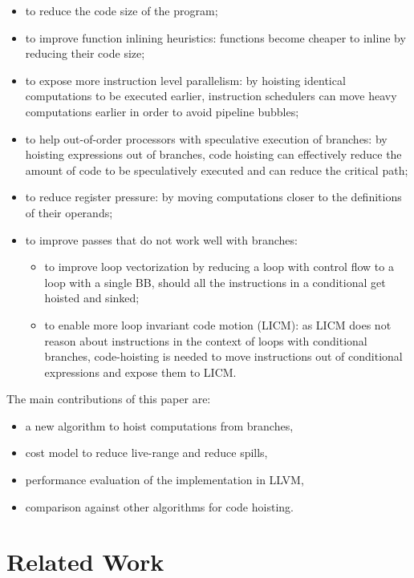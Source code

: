 \documentclass{sig-alternate}
\begin{document}
\begin{itemize}
\item to reduce the code size of the program;
\item to improve function inlining heuristics: functions become cheaper to
  inline by reducing their code size;
\item to expose more instruction level parallelism: by hoisting identical
  computations to be executed earlier, instruction schedulers can move heavy
  computations earlier in order to avoid pipeline bubbles;
\item to help out-of-order processors with speculative execution of branches: by
  hoisting expressions out of branches, code hoisting can effectively reduce the
  amount of code to be speculatively executed and can reduce the critical path;
\item to reduce register pressure: by moving computations closer to the
  definitions of their operands;
\item to improve passes that do not work well with branches:
  \begin{itemize}
  \item to improve loop vectorization by reducing a loop with control flow to a
    loop with a single BB, should all the instructions in a conditional get
    hoisted and sinked;
  \item to enable more loop invariant code motion (LICM): as LICM does not
    reason about instructions in the context of loops with conditional branches,
    code-hoisting is needed to move instructions out of conditional expressions
    and expose them to LICM.
  \end{itemize}
\end{itemize}

The main contributions of this paper are:
\begin{itemize}
\item a new algorithm to hoist computations from branches,
\item cost model to reduce live-range and reduce spills,
\item performance evaluation of the implementation in LLVM,
\item comparison against other algorithms for code hoisting.
\end{itemize}

\newpage

\section{Related Work}
\end{document}
